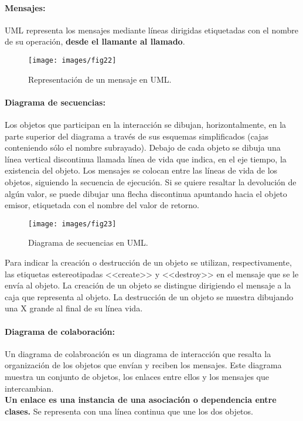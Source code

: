 \vspace{5mm}

\paragraph{Mensajes:}
UML representa los mensajes mediante líneas dirigidas etiquetadas con
el nombre de su operación, \textbf{desde el llamante al llamado}.

\begin{figure}[ht!]  \centering
  \texttt{[image: images/fig22]}
  \caption{Representación de un mensaje en UML.}
  \label{fig:22}
\end{figure}

\paragraph{Diagrama de secuencias:}
Los objetos que participan en la interacción se dibujan,
horizontalmente, en la parte superior del diagrama a través de sus
esquemas simplificados (cajas conteniendo sólo el nombre
subrayado). Debajo de cada objeto se dibuja una línea vertical
discontinua llamada línea de vida que indica, en el eje tiempo, la
existencia del objeto.
Los mensajes se colocan entre las líneas de vida de los objetos,
siguiendo la secuencia de ejecución. Si se quiere resaltar la
devolución de algún valor, se puede dibujar una flecha discontinua
apuntando hacia el objeto emisor, etiquetada con el nombre del valor
de retorno.

\begin{figure}[ht!]  \centering
  \texttt{[image: images/fig23]}
  \caption{Diagrama de secuencias en UML.}
  \label{fig:23}
\end{figure}

Para indicar la creación o destrucción de un objeto se utilizan,
respectivamente, las etiquetas estereotipadas \textrm{<<create>>} y
\textrm{<<destroy>>} en el mensaje que se le envía al objeto. La
creación de un objeto se distingue dirigiendo el mensaje a la caja que
representa al objeto. La destrucción de un objeto se muestra dibujando
una X grande al final de su línea vida.
\newpage
\paragraph{Diagrama de colaboración:}
Un diagrama de colabroación es un diagrama de interacción que resalta
la organización de los objetos que envían y reciben los mensajes. Este
diagrama muestra un conjunto de objetos, los enlaces entre ellos y los
mensajes que intercambian.\\
\textbf{Un enlace es una instancia de una asociación o dependencia entre
  clases.} Se representa con una línea continua que une los dos
objetos.

